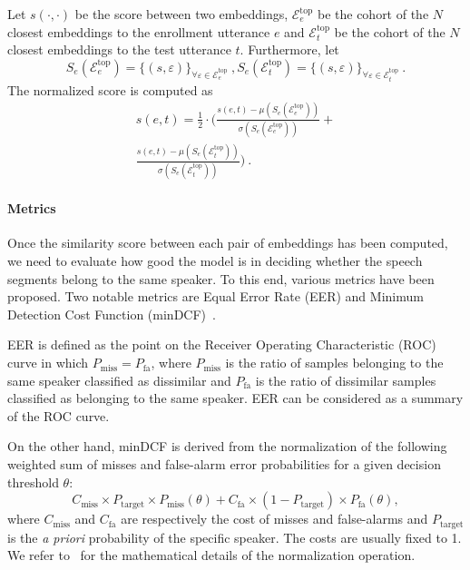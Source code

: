 \documentclass[conference]{IEEEtran}
\begin{document}
Let $s(\cdot,\cdot)$ be the score between two embeddings, $\mathcal{E}^{\text{top}}_e$ be the cohort of the $N$ closest embeddings to the enrollment utterance $e$ and $\mathcal{E}^{\text{top}}_t$ be the cohort of the $N$ closest embeddings to the test utterance $t$. Furthermore, let 
\begin{equation}
    S_e(\mathcal{E}^{\text{top}}_e) = \{(s,\varepsilon)\}_{\forall\varepsilon \in \mathcal{E}^{\text{top}}_e}~,
    S_e(\mathcal{E}^{\text{top}}_t) = \{(s,\varepsilon)\}_{\forall\varepsilon \in \mathcal{E}^{\text{top}}_t}~. 
\end{equation}
The normalized score is computed as
\begin{multline}
    s(e,t) = \frac{1}{2} \cdot \Bigg(\frac{s(e,t) - \mu(S_e(\mathcal{E}^{\text{top}}_e))}{\sigma(S_e(\mathcal{E}^{\text{top}}_e))} + \\
    \frac{s(e,t) - \mu(S_e(\mathcal{E}^{\text{top}}_t))}{\sigma(S_e(\mathcal{E}^{\text{top}}_t))}\Bigg)
    ~.
\end{multline}

\paragraph{Metrics}Once the similarity score between each pair of embeddings has been computed, we need to evaluate how good the model is in deciding whether the speech segments belong to the same speaker. To this end, various metrics have been proposed. Two notable metrics are Equal Error Rate (EER) and Minimum Detection Cost Function (minDCF)~\cite{brummer2013bosaris,nist2018}. 

EER is defined as the point on the Receiver Operating Characteristic (ROC) curve in which $P_{\text{miss}} = P_{\text{fa}}$, where $P_{\text{miss}}$ is the ratio of samples belonging to the same speaker classified as dissimilar and $P_{\text{fa}}$ is the ratio of dissimilar samples classified as belonging to the same speaker. EER can be considered as a summary of the ROC curve.

On the other hand, minDCF is derived from the normalization of the following weighted sum of misses and false-alarm error probabilities for a given decision threshold $\theta$:
\begin{equation}
    C_{\text{miss}} \times P_{\text{target}} \times P_{\text{miss}}(\theta) +
    C_{\text{fa}} \times (1 - P_{\text{target}}) \times P_{\text{fa}}(\theta) ,
\end{equation}
where $C_{\text{miss}}$ and $C_{\text{fa}}$ are respectively the cost of misses and false-alarms and $P_{\text{target}}$ is the \textit{a priori} probability of the specific speaker. The costs are usually fixed to 1. We refer to~\cite{nist2018} for the mathematical details of the normalization operation.
\end{document}
